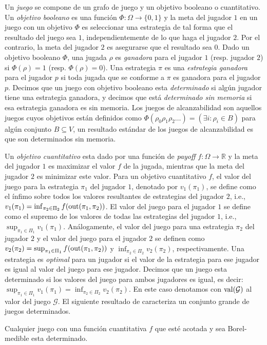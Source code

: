 Un \emph{juego} se compone de un grafo de juego y un objetivo booleano o cuantitativo. Un \emph{objetivo booleano} es una función $\Phi: \Omega \rightarrow \{0, 1\}$ y la meta del jugador $1$ en un juego con un objetivo $\Phi$ es seleccionar una estrategia de tal forma que el resultado del juego sea $1$, independientemente de lo que haga el jugador $2$. Por el contrario, la meta del jugador $2$ es asegurarse que el resultado sea $0$. Dado un objetivo booleano $\Phi$, una jugada $\rho$ es \emph{ganadora} para el jugador $1$ (resp. jugador $2$) si  $\Phi(\rho) = 1$ (resp. $\Phi(\rho) = 0$). Una estrategia $\pi$ es una \emph{estrategia ganadora} para el jugador $p$ si toda jugada que se conforme a $\pi$ es ganadora para el jugador $p$. Decimos que un juego con objetivo booleano esta \emph{determinado} si algún jugador tiene una estrategia ganadora, y decimos que está \emph{determinado sin memoria} si esa estrategia ganadora es sin memoria. Los juegos de alcanzabilidad son aquellos juegos cuyos objetivos están definidos como $\Phi(\rho_0 \rho_1 \rho_2 \dots) = (\exists i : \rho_i \in B)$ para algún conjunto $B \subseteq V$, un resultado estándar de los juegos de alcanzabilidad es que son determinados sin memoria.

Un \emph{objetivo cuantitativo} esta dado por una función de \emph{payoff} $f: \Omega \rightarrow \mathbb{R}$ y la meta del jugador $1$ es maximizar el valor $f$ de la jugada, mientras que la meta del jugador $2$ es minimizar este valor. Para un objetivo cuantitativo $f$, el valor del juego para la estrategia $\pi_1$ del jugador $1$, denotado por $v_1(\pi_1)$, se define como el ínfimo sobre todos los valores resultantes de estrategias del jugador $2$, i.e., $v_1(\pi_1) = \inf_{\pi_2 \in \Pi_2} f(\operatorname{out}(\pi_1, \pi_2))$. El valor del juego para el jugador $1$ se define como el supremo de los valores de todas las estrategias del jugador $1$, i.e., $\sup_{\pi_1 \in \Pi_1} v_1(\pi_1)$. Análogamente, el valor del juego para una estrategia $\pi_2$ del jugador $2$ y el valor del juego para el jugador $2$ se definen como $v_2(\pi_2) = \sup_{\pi_1 \in \Pi_1} f(\operatorname{out}(\pi_1, \pi_2))$ 
y $\inf_{\pi_2 \in \Pi_2} v_2(\pi_2)$, respectivamente.
Una estrategia es \emph{optimal} para un jugador si el valor de la estrategia para ese jugador es igual al valor del juego para ese jugador. Decimos que un juego esta determinado si los valores del juego para ambos jugadores es igual, es decir:
$\sup_{\pi_1 \in \Pi_1} v_1(\pi_1) = \inf_{\pi_2 \in \Pi_2} v_2(\pi_2)$. En este caso denotamos con $\operatorname{val}(\mathcal{G})$ al valor del juego $\mathcal{G}$.
    El siguiente resultado de \cite{Martin98} caracteriza un conjunto grande de juegos determinados.
    \begin{thm} Cualquier juego con una función cuantitativa $f$ que esté acotada y sea Borel-medible esta determinado.
\end{thm}


